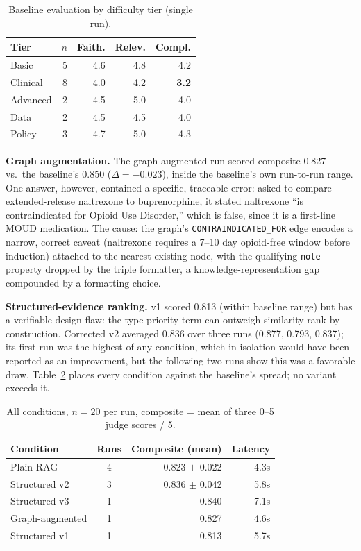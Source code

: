 \documentclass[letterpaper]{article}
\begin{document}
\begin{table}[t]
\centering\small
\caption{Baseline evaluation by difficulty tier (single run).}
\label{tab:difficulty}
\begin{tabular}{lrrrr}
\toprule
Tier & $n$ & Faith. & Relev. & Compl. \\
\midrule
Basic & 5 & 4.6 & 4.8 & 4.2 \\
Clinical & 8 & 4.0 & 4.2 & \textbf{3.2} \\
Advanced & 2 & 4.5 & 5.0 & 4.0 \\
Data & 2 & 4.5 & 4.5 & 4.0 \\
Policy & 3 & 4.7 & 5.0 & 4.3 \\
\bottomrule
\end{tabular}
\end{table}

\textbf{Graph augmentation.} The graph-augmented run scored composite 0.827 vs.\ the baseline's 0.850 ($\Delta=-0.023$), inside the baseline's own run-to-run range. One answer, however, contained a specific, traceable error: asked to compare extended-release naltrexone to buprenorphine, it stated naltrexone ``is contraindicated for Opioid Use Disorder,'' which is false, since it is a first-line MOUD medication. The cause: the graph's \texttt{CONTRAINDICATED\_FOR} edge encodes a narrow, correct caveat (naltrexone requires a 7--10 day opioid-free window before induction) attached to the nearest existing node, with the qualifying \texttt{note} property dropped by the triple formatter, a knowledge-representation gap compounded by a formatting choice.

\textbf{Structured-evidence ranking.} v1 scored 0.813 (within baseline range) but has a verifiable design flaw: the type-priority term can outweigh similarity rank by construction. Corrected v2 averaged 0.836 over three runs (0.877, 0.793, 0.837); its first run was the highest of any condition, which in isolation would have been reported as an improvement, but the following two runs show this was a favorable draw. Table~\ref{tab:allconditions} places every condition against the baseline's spread; no variant exceeds it.

\begin{table}[t]
\centering\small
\caption{All conditions, $n=20$ per run, composite = mean of three 0--5 judge scores / 5.}
\label{tab:allconditions}
\begin{tabular}{lcrr}
\toprule
Condition & Runs & Composite (mean) & Latency \\
\midrule
Plain RAG & 4 & 0.823 $\pm$ 0.022 & 4.3s \\
Structured v2 & 3 & 0.836 $\pm$ 0.042 & 5.8s \\
Structured v3 & 1 & 0.840 & 7.1s \\
Graph-augmented & 1 & 0.827 & 4.6s \\
Structured v1 & 1 & 0.813 & 5.7s \\
\bottomrule
\end{tabular}
\end{table}
\end{document}
